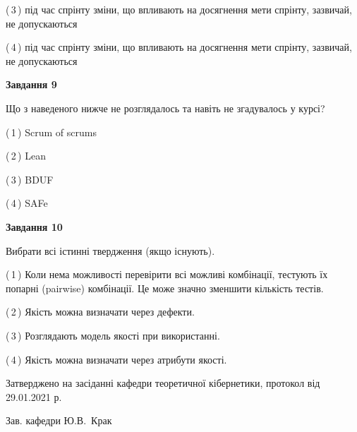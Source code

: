 \documentclass[10pt, ukrainian]{article}
\begin{document}
{\begin {large}
(\,3\,) під час спрінту зміни, що впливають на досягнення мети спрінту, зазвичай, не допускаються%



(\,4\,) під час спрінту зміни, що впливають на досягнення мети спрінту, зазвичай, не допускаються%


{\begin {center}\textbf{Завдання 9}\end {center}}\par
Що з наведеного нижче не розглядалось та навіть не згадувалось у курсі?\par
\vspace{2mm}



(\,1\,) Scrum of scrums%



(\,2\,) Lean%



(\,3\,) BDUF%



(\,4\,) SAFe%


{\begin {center}\textbf{Завдання 10}\end {center}}\par
Вибрати всі істинні твердження (якщо існують).\par
\vspace{2mm}



(\,1\,) Коли нема можливості перевірити всі можливі комбінації, тестують їх попарні (pairwise) комбінації. Це може значно зменшити кількість тестів.%



(\,2\,) Якість можна визначати через дефекти.%



(\,3\,) Розглядають модель якості при використанні.%



(\,4\,) Якість можна визначати через атрибути якості.%



\end {large}}
{\vspace{5mm}\smallskip \begin {small} Затверджено на засіданні кафедри теоретичної кібернетики, протокол  від   29.01.2021 р.\par\smallskip\smallskip
{\parbox {6.5 cm}{Зав. кафедри \dotfill Ю.В.~Крак}} \end{small}}
\newpage
\end{document}
